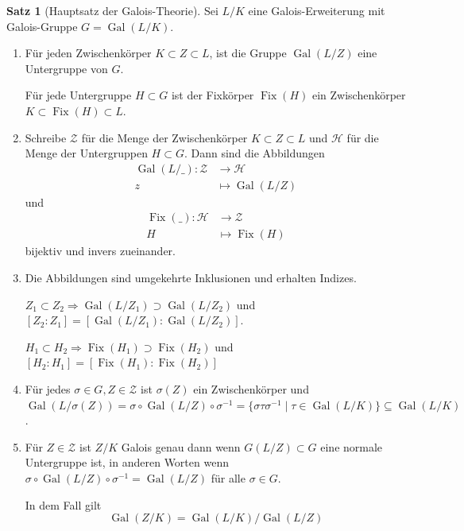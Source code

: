 \documentclass[12pt,parskip=full]{scrartcl}
\DeclareMathOperator{\Gal}{Gal}
\theoremstyle{definition}
\newtheorem{theorem}{Satz}[section]
\theoremstyle{remark}
\begin{document}
	\begin{theorem}[Hauptsatz der Galois-Theorie]
		Sei $L/K$ eine Galois-Erweiterung mit Galois-Gruppe $G = \Gal(L/K)$.
		\begin{enumerate}
			\item Für jeden Zwischenkörper $K \subset Z  \subset L$, ist die Gruppe $\Gal(L/Z)$ eine Untergruppe von $G$.
			
			Für jede Untergruppe $H \subset G$ ist der Fixkörper $\operatorname{Fix}(H)$ ein Zwischenkörper $K \subset \operatorname{Fix}(H) \subset L$.
			
			\item Schreibe $\mathcal{Z}$ für die Menge der Zwischenkörper $K \subset Z \subset L$ und $\mathcal{H}$ für die Menge der Untergruppen $H \subset G$. Dann sind die Abbildungen
			\begin{align*}
				\Gal(L/\_): \mathcal{Z} &\to \mathcal{H} \\
				z &\mapsto \Gal(L/Z)
			\end{align*}
			und
			\begin{align*}
				\operatorname{Fix}(\_): \mathcal{H} &\to \mathcal{Z} \\
				H &\mapsto \operatorname{Fix}(H)
			\end{align*}
			bijektiv und invers zueinander.
			
			\item Die Abbildungen sind umgekehrte Inklusionen und erhalten Indizes.
			
			$Z_1 \subset Z_2 \Rightarrow \Gal(L/Z_1) \supset \Gal(L/Z_2)$ und $[Z_2: Z_1] = [\Gal(L/Z_1):\Gal(L/Z_2)]$.
			
			$H_1 \subset H_2 \Rightarrow \operatorname{Fix}(H_1) \supset \operatorname{Fix}(H_2)$ und $[H_2:H_1] = [\operatorname{Fix}(H_1): \operatorname{Fix}(H_2)]$
			
			\item Für jedes $\sigma \in G, Z \in \mathcal{Z}$ ist $\sigma(Z)$ ein Zwischenkörper und $\Gal(L/\sigma(Z)) = \sigma \circ \Gal(L/Z) \circ \sigma^{-1} = \{ \sigma \tau \sigma^{-1} \mid \tau \in \Gal(L/K) \} \subseteq \Gal(L/K)$.
			
			\item Für $Z \in \mathcal{Z}$ ist $Z/K$ Galois genau dann wenn $G(L/Z) \subset G$ eine normale Untergruppe ist, in anderen Worten wenn $\sigma \circ \Gal(L/Z) \circ \sigma^{-1} = \Gal(L/Z)$ für alle $\sigma \in G$.
			
			In dem Fall gilt
			\begin{equation*}
				\Gal(Z/K) = \Gal(L/K) / \Gal(L/Z)
			\end{equation*}
		\end{enumerate}
	\end{theorem}
\end{document}
